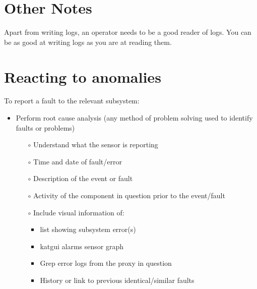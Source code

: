 \section{ Other Notes}
Apart from writing logs, an operator needs to be a good reader of logs. You can be as good at writing logs as you are at reading them.

\section{ Reacting to anomalies}
To report a fault to the relevant subsystem:
\begin{itemize}
\item Perform root cause analysis (any method of problem solving used to identify faults or problems) 
\begin{itemize}
\item[$\circ$] Understand what the sensor is reporting
\item[$\circ$] Time and date of fault/error
\item[$\circ$] Description of the event or fault
\item[$\circ$] Activity of the component in question prior to the event/fault
\item[$\circ$] Include visual information of:
\begin{itemize}
	\item list showing subsystem error(s)
	\item  katgui alarms
	sensor graph  
	\item Grep error logs from the proxy in question
	\item  History or link to previous identical/similar faults
\end{itemize}
\end{itemize}


\end{itemize}

